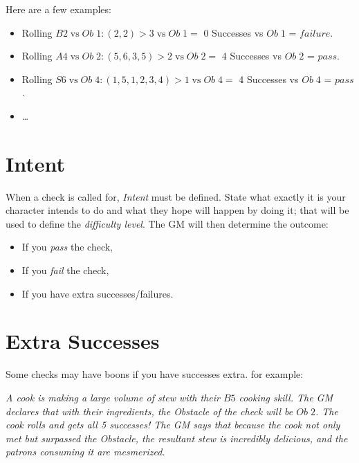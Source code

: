 \documentclass[../main.tex]{subfiles}
\begin{document}
    Here are a few examples:

    \begin{itemize}
        \item Rolling $B2\mathrm{\; vs \;}Ob\; 1: (2, 2)>3\mathrm{\; vs \;}Ob\; 1 =$ 0 Successes vs $Ob\; 1$ = $failure$.
        \item Rolling $A4\mathrm{\; vs \;}Ob\; 2: (5, 6, 3, 5)>2\mathrm{\; vs \;}Ob\; 2 =$ 4 Successes vs $Ob\; 2$ = $pass$.
        \item Rolling $S6\mathrm{\; vs \;}Ob\; 4: (1, 5, 1, 2, 3, 4)>1\mathrm{\; vs \;}Ob\; 4 =$ 4 Successes vs $Ob\; 4$ = $pass$.
        \item \dots
    \end{itemize}

    \section{Intent}

    When a check is called for, {\em Intent} must be defined. State what exactly it is your character intends to do and what they hope will happen by doing it; that will be used to define the {\em difficulty level}. The GM will then determine the outcome:

    \begin{itemize}
        \item If you {\em pass} the check,
        \item If you {\em fail} the check,
        \item If you have extra successes/failures.
    \end{itemize}

    \section{Extra Successes}

    Some checks may have boons if you have successes extra. for example:

    \begin{displayquote}
        {\em A cook is making a large volume of stew with their $B5$ cooking skill. The GM declares that with their ingredients, the Obstacle of the check will be $Ob\; 2$. The cook rolls and gets all 5 successes! The GM says that because the cook not only met but surpassed the Obstacle, the resultant stew is incredibly delicious, and the patrons consuming it are mesmerized.}
    \end{displayquote}
\end{document}
